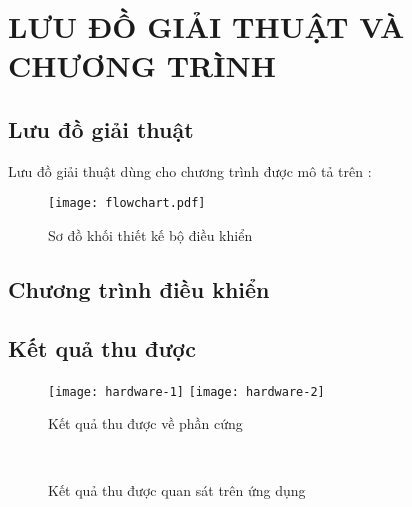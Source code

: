 \chapter{LƯU ĐỒ GIẢI THUẬT VÀ CHƯƠNG TRÌNH}

\section{Lưu đồ giải thuật}

    Lưu đồ giải thuật dùng cho chương trình được mô tả trên \fig{\ref{Fig:flowchart}}:

    \begin{figure}[htp]
        \begin{center}
            \hspace*{-1cm}\texttt{[image: flowchart.pdf]}
        \end{center}
        \caption{Sơ đồ khối thiết kế bộ điều khiển} \label{Fig:flowchart}
    \end{figure}

\section{Chương trình điều khiển}
    

\section{Kết quả thu được}
    \begin{figure}[htp]
        \begin{center}
            \hspace*{-1cm}\texttt{[image: hardware-1]}
            \texttt{[image: hardware-2]}
        \end{center}
        \caption{Kết quả thu được về phần cứng} \label{Fig:result}
    \end{figure}

    \begin{figure}[htp]
        \begin{center}
            \\

        \end{center}
        \caption{Kết quả thu được quan sát trên ứng dụng} \label{Fig:result}
    \end{figure}
